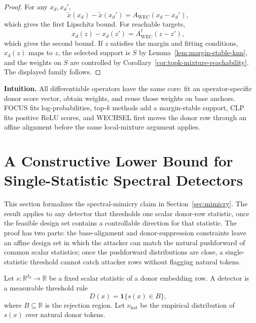 \begin{proof}
For any $x_d,x_d'$,
\[
\widetilde{x}(x_d)-\widetilde{x}(x_d')=A_{\mathrm{WEC}}(x_d-x_d'),
\]
which gives the first Lipschitz bound. For reachable targets,
\[
x_d(z)-x_d(z')=A_{\mathrm{WEC}}^\dagger(z-z'),
\]
which gives the second bound. If $z$ satisfies the margin and fitting conditions, $x_d(z)$ maps to $z$, the selected support is $S$ by Lemma~\ref{lem:margin-stable-knn}, and the weights on $S$ are controlled by Corollary~\ref{cor:topk-mixture-reachability}. The displayed family follows.
\end{proof}

\noindent\textbf{Intuition.}
All differentiable operators have the same core: fit an operator-specific donor score vector, obtain weights, and reuse those weights on base anchors. FOCUS fits log-probabilities, top-$k$ methods add a margin-stable support, CLP fits positive ReLU scores, and WECHSEL first moves the donor row through an affine alignment before the same local-mixture argument applies.

\section{A Constructive Lower Bound for Single-Statistic Spectral Detectors}
\label{app:spectral-detector-lower-bound}

This section formalizes the spectral-mimicry claim in Section~\ref{sec:mimicry}. The result applies to any detector that thresholds one scalar donor-row statistic, once the feasible design set contains a controllable direction for that statistic. The proof has two parts: the base-alignment and donor-suppression constraints leave an affine design set in which the attacker can match the natural pushforward of common scalar statistics; once the pushforward distributions are close, a single-statistic threshold cannot catch attacker rows without flagging natural tokens.

\begin{assumption}
\label{ass:single-statistic-threshold}
Let $s:\mathbb{R}^{\delta_d}\to\mathbb{R}$ be a fixed scalar statistic of a donor embedding row. A detector is a measurable threshold rule
\[
D(x)=\mathbf{1}\{s(x)\in B\},
\]
where $B\subseteq\mathbb{R}$ is the rejection region. Let $\nu_{\mathrm{nat}}$ be the empirical distribution of $s(x)$ over natural donor tokens.
\end{assumption}

